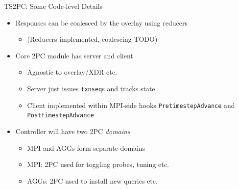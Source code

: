 \documentclass[
  ignorenonframetext,
]{beamer}
\providecommand{\tightlist}{%
  \setlength{\itemsep}{0pt}\setlength{\parskip}{0pt}}\usepackage{longtable,booktabs,array}
\begin{document}
\begin{frame}[fragile]{TS2PC: Some Code-level Details}
\label{ts2pc-some-code-level-details}
\begin{itemize}
\tightlist
\item
  Responses can be coalesced by the overlay using reducers

  \begin{itemize}
  \tightlist
  \item
    (Reducers implemented, coalescing TODO)
  \end{itemize}
\end{itemize}

\pause

\begin{itemize}
\tightlist
\item
  Core 2PC module has server and client

  \begin{itemize}
  \tightlist
  \item
    Agnostic to overlay/XDR etc.
  \item
    Server just issues \texttt{txnseq}s and tracks state
  \item
    Client implemented within MPI-side hooks \texttt{PretimestepAdvance}
    and \texttt{PosttimestepAdvance}
  \end{itemize}
\end{itemize}

\pause

\begin{itemize}
\tightlist
\item
  Controller will have two 2PC \emph{domains}

  \begin{itemize}
  \tightlist
  \item
    MPI and AGGs form separate domains
  \item
    MPI: 2PC used for toggling probes, tuning etc.
  \item
    AGGs: 2PC used to install new queries etc.
  \end{itemize}
\end{itemize}
\end{frame}
\end{document}
